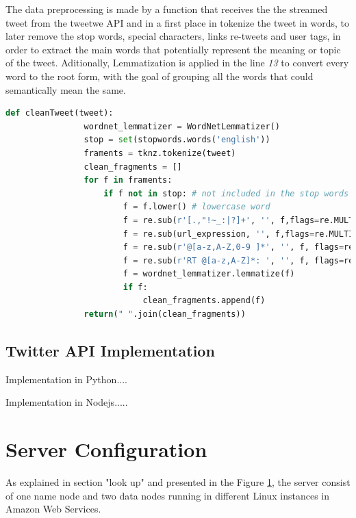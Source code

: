 \documentclass{article}
\begin{document}
        The data preprocessing is made by a function that receives the the streamed tweet from the tweetwe API and in a first place in tokenize the tweet in words, to later remove the stop words, special characters, links
        re-tweets and user tags, in order to extract the main words that potentially represent the meaning or topic of the tweet. Aditionally, Lemmatization is applied in the line \textit{13} to convert every word to the root 
        form, with the goal of grouping all the words that could semantically mean the same.
        \begin{lstlisting}[language=Python, caption= Tweet cleaning function, label={lst:dataCleaning}]
            def cleanTweet(tweet):    
                wordnet_lemmatizer = WordNetLemmatizer()
                stop = set(stopwords.words('english'))
                framents = tknz.tokenize(tweet)
                clean_fragments = []
                for f in framents:
                    if f not in stop: # not included in the stop words
                        f = f.lower() # lowercase word
                        f = re.sub(r'[.,"!~_:|?]+', '', f,flags=re.MULTILINE)
                        f = re.sub(url_expression, '', f,flags=re.MULTILINE) 
                        f = re.sub(r'@[a-z,A-Z,0-9 ]*', '', f, flags=re.MULTILINE) 
                        f = re.sub(r'RT @[a-z,A-Z]*: ', '', f, flags=re.MULTILINE) 
                        f = wordnet_lemmatizer.lemmatize(f)
                        if f:
                            clean_fragments.append(f)
                return(" ".join(clean_fragments))
        \end{lstlisting}

        \subsection{Twitter API Implementation}

        Implementation in Python....

        Implementation in Nodejs.....
        \section{Server Configuration}

        As  explained in section "look up" and presented in the Figure \ref{}, the server consist of one name node and two data nodes running in different Linux instances in Amazon Web Services.
\end{document}
